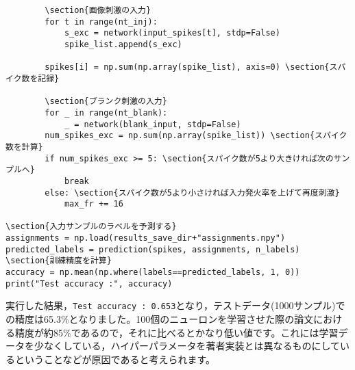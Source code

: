 \begin{verbatim}
        \section{画像刺激の入力}
        for t in range(nt_inj):
            s_exc = network(input_spikes[t], stdp=False)
            spike_list.append(s_exc)
        
        spikes[i] = np.sum(np.array(spike_list), axis=0) \section{スパイク数を記録}
        
        \section{ブランク刺激の入力}
        for _ in range(nt_blank):
            _ = network(blank_input, stdp=False)
        num_spikes_exc = np.sum(np.array(spike_list)) \section{スパイク数を計算}
        if num_spikes_exc >= 5: \section{スパイク数が5より大きければ次のサンプルへ}
            break
        else: \section{スパイク数が5より小さければ入力発火率を上げて再度刺激}
            max_fr += 16
            
\section{入力サンプルのラベルを予測する}
assignments = np.load(results_save_dir+"assignments.npy")
predicted_labels = prediction(spikes, assignments, n_labels)
\section{訓練精度を計算}
accuracy = np.mean(np.where(labels==predicted_labels, 1, 0))
print("Test accuracy :", accuracy)
\end{verbatim}
実行した結果，\colorbox{shadecolor}{\texttt{Test accuracy : 0.653}}となり，テストデータ(1000サンプル)での精度は65.3\%となりました。100個のニューロンを学習させた際の論文における精度が約85\%であるので，それに比べるとかなり低い値です。これには学習データを少なくしている，ハイパーパラメータを著者実装とは異なるものにしているということなどが原因であると考えられます。
